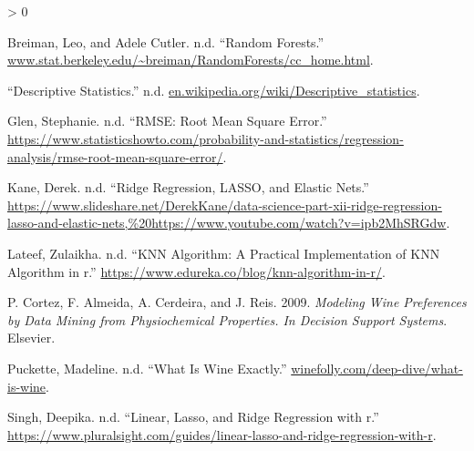 \documentclass[
]{book}
\newlength{\cslhangindent}
\newenvironment{CSLReferences}[2] %
 {%
  \setlength{\parindent}{0pt}
  \ifodd #1 \everypar{\setlength{\hangindent}{\cslhangindent}}\ignorespaces\fi
  \ifnum #2 > 0
  \setlength{\parskip}{#2\baselineskip}
  \fi
 }%
 {}
\begin{document}
\hypertarget{refs}{}
\begin{CSLReferences}{1}{0}
\leavevmode\hypertarget{ref-random_forests}{}%
Breiman, Leo, and Adele Cutler. n.d. {``Random Forests.''} \href{https://www.stat.berkeley.edu/~breiman/RandomForests/cc_home.html}{www.stat.berkeley.edu/\textasciitilde breiman/RandomForests/cc\_home.html}.

\leavevmode\hypertarget{ref-descrip_stat}{}%
{``Descriptive Statistics.''} n.d. \href{https://en.wikipedia.org/wiki/Descriptive_statistics}{en.wikipedia.org/wiki/Descriptive\_statistics}.

\leavevmode\hypertarget{ref-RMSE}{}%
Glen, Stephanie. n.d. {``RMSE: Root Mean Square Error.''} \url{https://www.statisticshowto.com/probability-and-statistics/regression-analysis/rmse-root-mean-square-error/}.

\leavevmode\hypertarget{ref-elastic_net}{}%
Kane, Derek. n.d. {``Ridge Regression, LASSO, and Elastic Nets.''} \url{https://www.slideshare.net/DerekKane/data-science-part-xii-ridge-regression-lasso-and-elastic-nets,\%20https://www.youtube.com/watch?v=ipb2MhSRGdw}.

\leavevmode\hypertarget{ref-knn}{}%
Lateef, Zulaikha. n.d. {``KNN Algorithm: A Practical Implementation of KNN Algorithm in r.''} \url{https://www.edureka.co/blog/knn-algorithm-in-r/}.

\leavevmode\hypertarget{ref-model_wine}{}%
P. Cortez, F. Almeida, A. Cerdeira, and J. Reis. 2009. \emph{Modeling Wine Preferences by Data Mining from Physiochemical Properties. In Decision Support Systems}. Elsevier.

\leavevmode\hypertarget{ref-wine_exactly_web}{}%
Puckette, Madeline. n.d. {``What Is Wine Exactly.''} \href{https://winefolly.com/deep-dive/what-is-wine}{winefolly.com/deep-dive/what-is-wine}.

\leavevmode\hypertarget{ref-regression_r}{}%
Singh, Deepika. n.d. {``Linear, Lasso, and Ridge Regression with r.''} \url{https://www.pluralsight.com/guides/linear-lasso-and-ridge-regression-with-r}.

\end{CSLReferences}
\end{document}
